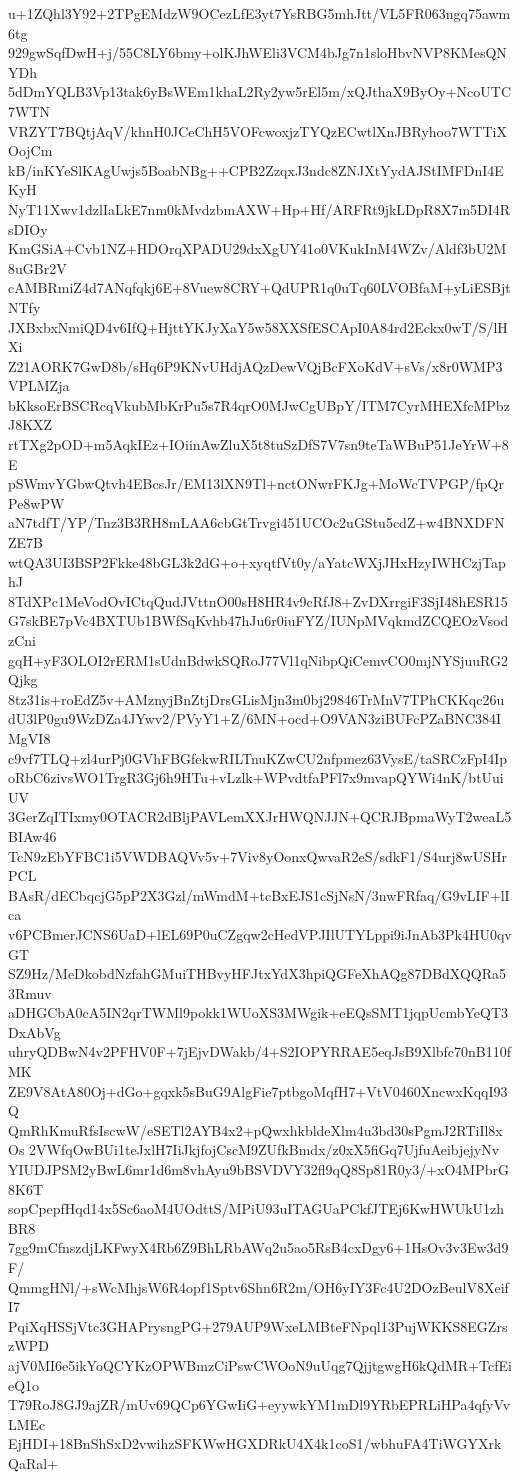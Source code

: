 u+1ZQhl3Y92+2TPgEMdzW9OCezLfE3yt7YsRBG5mhJtt/VL5FR063ngq75awm6tg
929gwSqfDwH+j/55C8LY6bmy+olKJhWEli3VCM4bJg7n1sloHbvNVP8KMesQNYDh
5dDmYQLB3Vp13tak6yBsWEm1khaL2Ry2yw5rEl5m/xQJthaX9ByOy+NcoUTC7WTN
VRZYT7BQtjAqV/khnH0JCeChH5VOFcwoxjzTYQzECwtlXnJBRyhoo7WTTiXOojCm
kB/inKYeSlKAgUwjs5BoabNBg++CPB2ZzqxJ3ndc8ZNJXtYydAJStIMFDnI4EKyH
NyT11Xwv1dzlIaLkE7nm0kMvdzbmAXW+Hp+Hf/ARFRt9jkLDpR8X7m5DI4RsDIOy
KmGSiA+Cvb1NZ+HDOrqXPADU29dxXgUY41o0VKukInM4WZv/Aldf3bU2M8uGBr2V
cAMBRmiZ4d7ANqfqkj6E+8Vuew8CRY+QdUPR1q0uTq60LVOBfaM+yLiESBjtNTfy
JXBxbxNmiQD4v6IfQ+HjttYKJyXaY5w58XXSfESCApI0A84rd2Eckx0wT/S/lHXi
Z21AORK7GwD8b/sHq6P9KNvUHdjAQzDewVQjBcFXoKdV+sVs/x8r0WMP3VPLMZja
bKksoErBSCRcqVkubMbKrPu5s7R4qrO0MJwCgUBpY/ITM7CyrMHEXfcMPbzJ8KXZ
rtTXg2pOD+m5AqkIEz+IOiinAwZluX5t8tuSzDfS7V7sn9teTaWBuP51JeYrW+8E
pSWmvYGbwQtvh4EBcsJr/EM13lXN9Tl+nctONwrFKJg+MoWcTVPGP/fpQrPe8wPW
aN7tdfT/YP/Tnz3B3RH8mLAA6cbGtTrvgi451UCOc2uGStu5cdZ+w4BNXDFNZE7B
wtQA3UI3BSP2Fkke48bGL3k2dG+o+xyqtfVt0y/aYatcWXjJHxHzyIWHCzjTaphJ
8TdXPc1MeVodOvICtqQudJVttnO00sH8HR4v9cRfJ8+ZvDXrrgiF3SjI48hESR15
G7skBE7pVc4BXTUb1BWfSqKvhb47hJu6r0iuFYZ/IUNpMVqkmdZCQEOzVsodzCni
gqH+yF3OLOI2rERM1sUdnBdwkSQRoJ77Vl1qNibpQiCemvCO0mjNYSjuuRG2Qjkg
8tz31is+roEdZ5v+AMznyjBnZtjDrsGLisMjn3m0bj29846TrMnV7TPhCKKqc26u
dU3lP0gu9WzDZa4JYwv2/PVyY1+Z/6MN+ocd+O9VAN3ziBUFcPZaBNC384IMgVI8
c9vf7TLQ+zl4urPj0GVhFBGfekwRILTnuKZwCU2nfpmez63VysE/taSRCzFpI4Ip
oRbC6zivsWO1TrgR3Gj6h9HTu+vLzlk+WPvdtfaPFl7x9mvapQYWi4nK/btUuiUV
3GerZqITIxmy0OTACR2dBljPAVLemXXJrHWQNJJN+QCRJBpmaWyT2weaL5BIAw46
TcN9zEbYFBC1i5VWDBAQVv5v+7Viv8yOonxQwvaR2eS/sdkF1/S4urj8wUSHrPCL
BAsR/dECbqcjG5pP2X3Gzl/mWmdM+tcBxEJS1cSjNsN/3nwFRfaq/G9vLIF+lIca
v6PCBmerJCNS6UaD+lEL69P0uCZgqw2cHedVPJIlUTYLppi9iJnAb3Pk4HU0qvGT
SZ9Hz/MeDkobdNzfahGMuiTHBvyHFJtxYdX3hpiQGFeXhAQg87DBdXQQRa53Rmuv
aDHGCbA0cA5IN2qrTWMl9pokk1WUoXS3MWgik+eEQsSMT1jqpUcmbYeQT3DxAbVg
uhryQDBwN4v2PFHV0F+7jEjvDWakb/4+S2IOPYRRAE5eqJsB9Xlbfc70nB110fMK
ZE9V8AtA80Oj+dGo+gqxk5sBuG9AlgFie7ptbgoMqfH7+VtV0460XncwxKqqI93Q
QmRhKmuRfsIscwW/eSETl2AYB4x2+pQwxhkbldeXlm4u3bd30sPgmJ2RTiIl8xOs
2VWfqOwBUi1teJxlH7IiJkjfojCscM9ZUfkBmdx/z0xX5fiGq7UjfuAeibjejyNv
YIUDJPSM2yBwL6mr1d6m8vhAyu9bBSVDVY32fl9qQ8Sp81R0y3/+xO4MPbrG8K6T
sopCpepfHqd14x5Sc6aoM4UOdttS/MPiU93uITAGUaPCkfJTEj6KwHWUkU1zhBR8
7gg9mCfnszdjLKFwyX4Rb6Z9BhLRbAWq2u5ao5RsB4cxDgy6+1HsOv3v3Ew3d9F/
QmmgHNl/+sWcMhjsW6R4opf1Sptv6Shn6R2m/OH6yIY3Fc4U2DOzBeulV8XeifI7
PqiXqHSSjVtc3GHAPrysngPG+279AUP9WxeLMBteFNpql13PujWKKS8EGZrszWPD
ajV0MI6e5ikYoQCYKzOPWBmzCiPswCWOoN9uUqg7QjjtgwgH6kQdMR+TcfEieQ1o
T79RoJ8GJ9ajZR/mUv69QCp6YGwIiG+eyywkYM1mDl9YRbEPRLiHPa4qfyVvLMEc
EjHDI+18BnShSxD2vwihzSFKWwHGXDRkU4X4k1coS1/wbhuFA4TiWGYXrkQaRal+
